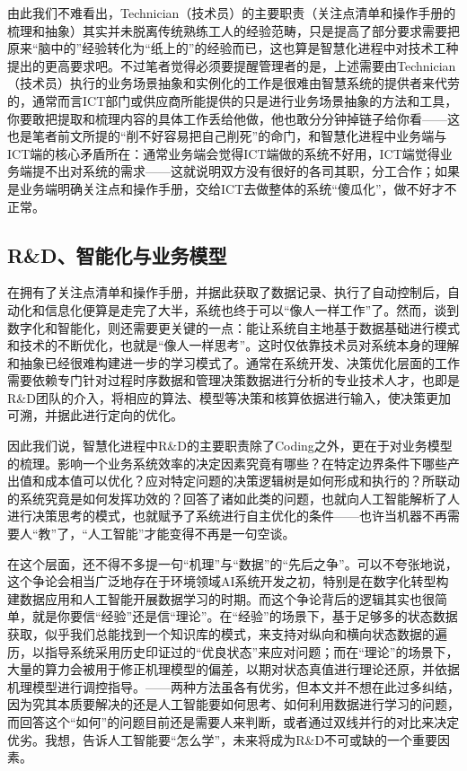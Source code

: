 \documentclass[]{book}
\begin{document}
由此我们不难看出，Technician（技术员）的主要职责（关注点清单和操作手册的梳理和抽象）其实并未脱离传统熟练工人的经验范畴，只是提高了部分要求需要把原来``脑中的''经验转化为``纸上的''的经验而已，这也算是智慧化进程中对技术工种提出的更高要求吧。不过笔者觉得必须要提醒管理者的是，上述需要由Technician（技术员）执行的业务场景抽象和实例化的工作是很难由智慧系统的提供者来代劳的，通常而言ICT部门或供应商所能提供的只是进行业务场景抽象的方法和工具，你要敢把提取和梳理内容的具体工作丢给他做，他也敢分分钟掉链子给你看------这也是笔者前文所提的``削不好容易把自己削死''的命门，和智慧化进程中业务端与ICT端的核心矛盾所在：通常业务端会觉得ICT端做的系统不好用，ICT端觉得业务端提不出对系统的需求------这就说明双方没有很好的各司其职，分工合作；如果是业务端明确关注点和操作手册，交给ICT去做整体的系统``傻瓜化''，做不好才不正常。

\hypertarget{rdux667aux80fdux5316ux4e0eux4e1aux52a1ux6a21ux578b}{%
\subsection{R\&D、智能化与业务模型}\label{rdux667aux80fdux5316ux4e0eux4e1aux52a1ux6a21ux578b}}

在拥有了关注点清单和操作手册，并据此获取了数据记录、执行了自动控制后，自动化和信息化便算是走完了大半，系统也终于可以``像人一样工作''了。然而，谈到数字化和智能化，则还需要更关键的一点：能让系统自主地基于数据基础进行模式和技术的不断优化，也就是``像人一样思考''。这时仅依靠技术员对系统本身的理解和抽象已经很难构建进一步的学习模式了。通常在系统开发、决策优化层面的工作需要依赖专门针对过程时序数据和管理决策数据进行分析的专业技术人才，也即是R\&D团队的介入，将相应的算法、模型等决策和核算依据进行输入，使决策更加可溯，并据此进行定向的优化。

因此我们说，智慧化进程中R\&D的主要职责除了Coding之外，更在于对业务模型的梳理。影响一个业务系统效率的决定因素究竟有哪些？在特定边界条件下哪些产出值和成本值可以优化？应对特定问题的决策逻辑树是如何形成和执行的？所联动的系统究竟是如何发挥功效的？回答了诸如此类的问题，也就向人工智能解析了人进行决策思考的模式，也就赋予了系统进行自主优化的条件------也许当机器不再需要人``教''了，``人工智能''才能变得不再是一句空谈。

在这个层面，还不得不多提一句``机理''与``数据''的``先后之争''。可以不夸张地说，这个争论会相当广泛地存在于环境领域AI系统开发之初，特别是在数字化转型构建数据应用和人工智能开展数据学习的时期。而这个争论背后的逻辑其实也很简单，就是你要信``经验''还是信``理论''。在``经验''的场景下，基于足够多的状态数据获取，似乎我们总能找到一个知识库的模式，来支持对纵向和横向状态数据的遍历，以指导系统采用历史印证过的``优良状态''来应对问题；而在``理论''的场景下，大量的算力会被用于修正机理模型的偏差，以期对状态真值进行理论还原，并依据机理模型进行调控指导。------两种方法虽各有优劣，但本文并不想在此过多纠结，因为究其本质要解决的还是人工智能要如何思考、如何利用数据进行学习的问题，而回答这个``如何''的问题目前还是需要人来判断，或者通过双线并行的对比来决定优劣。我想，告诉人工智能要``怎么学''，未来将成为R\&D不可或缺的一个重要因素。
\end{document}
